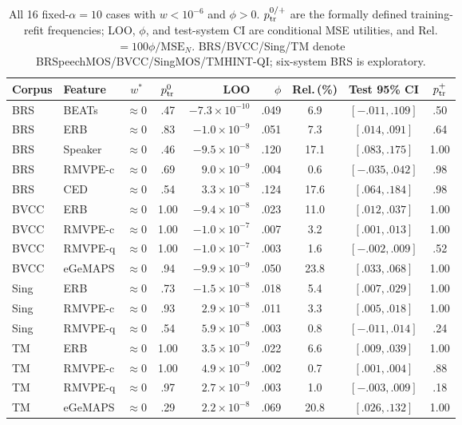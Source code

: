 \begin{table}[!t]
\caption{All 16 fixed-$\alpha=10$ cases with $w<10^{-6}$ and $\phi>0$. $p_{\rm tr}^{0/+}$ are the formally defined training-refit frequencies; LOO, $\phi$, and test-system CI are conditional MSE utilities, and Rel.$=100\phi/\mathrm{MSE}_{N}$. BRS/BVCC/Sing/TM denote BRSpeechMOS/BVCC/SingMOS/TMHINT-QI; six-system BRS is exploratory.}
\label{tab:zerogate_cases}
\centering
\small
\setlength{\tabcolsep}{2.2pt}
\renewcommand{\arraystretch}{0.82}
\begin{tabular}{llccrrccc}
\toprule
Corpus & Feature & $w^*$ & $p_{\rm tr}^{0}$ & LOO & $\phi$ & Rel.\,(\%) & Test 95\% CI & $p_{\rm tr}^{+}$ \\
\midrule
BRS & BEATs      & $\approx0$ & .47 & $-7.3\!\times\!10^{-10}$ & .049 & 6.9 & $[-.011,.109]$ & .50 \\
BRS & ERB        & $\approx0$ & .83 & $-1.0\!\times\!10^{-9}$  & .051 & 7.3 & $[.014,.091]$  & .64 \\
BRS & Speaker    & $\approx0$ & .46 & $-9.5\!\times\!10^{-8}$  & .120 & 17.1 & $[.083,.175]$ & 1.00 \\
BRS & RMVPE-c    & $\approx0$ & .69 & $ 9.0\!\times\!10^{-9}$  & .004 & 0.6 & $[-.035,.042]$ & .98 \\
BRS & CED        & $\approx0$ & .54 & $ 3.3\!\times\!10^{-8}$  & .124 & 17.6 & $[.064,.184]$ & .98 \\
BVCC & ERB        & $\approx0$ & 1.00 & $-9.4\!\times\!10^{-8}$ & .023 & 11.0 & $[.012,.037]$ & 1.00 \\
BVCC & RMVPE-c    & $\approx0$ & 1.00 & $-1.0\!\times\!10^{-7}$ & .007 & 3.2 & $[.001,.013]$ & 1.00 \\
BVCC & RMVPE-q    & $\approx0$ & 1.00 & $-1.0\!\times\!10^{-7}$ & .003 & 1.6 & $[-.002,.009]$ & .52 \\
BVCC & eGeMAPS    & $\approx0$ & .94 & $-9.9\!\times\!10^{-9}$ & .050 & 23.8 & $[.033,.068]$ & 1.00 \\
Sing & ERB        & $\approx0$ & .73 & $-1.5\!\times\!10^{-8}$ & .018 & 5.4 & $[.007,.029]$ & 1.00 \\
Sing & RMVPE-c    & $\approx0$ & .93 & $ 2.9\!\times\!10^{-8}$ & .011 & 3.3 & $[.005,.018]$ & 1.00 \\
Sing & RMVPE-q    & $\approx0$ & .54 & $ 5.9\!\times\!10^{-8}$ & .003 & 0.8 & $[-.011,.014]$ & .24 \\
TM & ERB          & $\approx0$ & 1.00 & $ 3.5\!\times\!10^{-9}$ & .022 & 6.6 & $[.009,.039]$ & 1.00 \\
TM & RMVPE-c      & $\approx0$ & 1.00 & $ 4.9\!\times\!10^{-9}$ & .002 & 0.7 & $[.001,.004]$ & .88 \\
TM & RMVPE-q      & $\approx0$ & .97 & $ 2.7\!\times\!10^{-9}$ & .003 & 1.0 & $[-.003,.009]$ & .18 \\
TM & eGeMAPS      & $\approx0$ & .29 & $ 2.2\!\times\!10^{-8}$ & .069 & 20.8 & $[.026,.132]$ & 1.00 \\
\bottomrule
\end{tabular}
\end{table}
